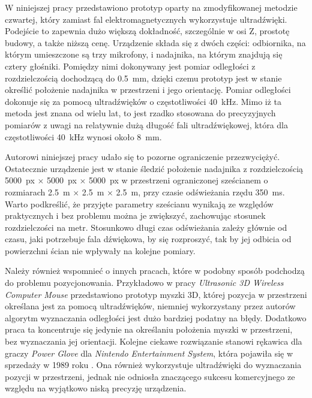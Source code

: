  W niniejszej pracy przedstawiono prototyp oparty na zmodyfikowanej metodzie czwartej, który zamiast 
 fal elektromagnetycznych wykorzystuje ultradźwięki. 
 Podejście to zapewnia dużo większą dokładność, szczególnie w osi Z, prostotę budowy, a także niższą cenę.
 Urządzenie składa się z dwóch części: odbiornika, na którym umieszczone są trzy mikrofony, i nadajnika,
 na którym znajdują się cztery głośniki. Pomiędzy nimi dokonywany jest pomiar odległości z rozdzielczością
 dochodzącą do \SI{0,5}{mm}, dzięki czemu prototyp jest w stanie określić położenie nadajnika
w przestrzeni i jego orientację. 
Pomiar odległości dokonuje się za pomocą ultradźwięków o częstotliwości \SI{40}{kHz}.
Mimo iż ta metoda jest znana od wielu lat, to jest  rzadko stosowana do precyzyjnych pomiarów
z uwagi na relatywnie dużą długość fali ultradźwiękowej,
która dla częstotliwości \SI{40}{kHz} wynosi około \SI{8}{mm}.

Autorowi niniejszej pracy udało się to pozorne ograniczenie przezwyciężyć.
Ostatecznie urządzenie jest w stanie śledzić położenie nadajnika z rozdzielczością 
\SI{5000}{px} $\times$ \SI{5000}{px} $\times$ \SI{5000}{px} w przestrzeni ograniczonej sześcianem o rozmiarach 
\SI{2,5}{m} $\times$ \SI{2,5}{m}  $\times$ \SI{2,5}{m}, przy czasie odświeżania rzędu \SI{350}{ms}.
Warto podkreślić, że przyjęte parametry sześcianu wynikają ze względów praktycznych i bez 
problemu można je zwiększyć, zachowując stosunek rozdzielczości na metr.
Stosunkowo długi czas odświeżania zależy głównie od czasu,  
 jaki potrzebuje fala dźwiękowa, by się rozproszyć,
 tak by jej odbicia od powierzchni ścian nie wpływały na kolejne pomiary.

Należy również wspomnieć o innych pracach, które w podobny sposób podchodzą do problemu pozycjonowania. Przykładowo 
w pracy \textit{Ultrasonic 3D Wireless Computer Mouse} \cite{bib:mouse} przedstawiono prototyp myszki 3D, której
pozycja w przestrzeni określana jest za pomocą ultradźwięków, niemniej wykorzystany przez autorów algorytm wyznaczania 
odległości jest dużo bardziej podatny na błędy. Dodatkowo praca ta koncentruje się jedynie
na określaniu położenia myszki w przestrzeni, bez wyznaczania jej orientacji.
Kolejne ciekawe rozwiązanie stanowi rękawica dla graczy 
\textit{Power Glove} \cite{bib:powerGlove} dla
\textit{Nintendo Entertainment System}, która pojawiła się w sprzedaży w  1989 roku \cite{bib:powerGlove2}. 
Ona również wykorzystuje ultradźwięki do wyznaczania pozycji
w przestrzeni, jednak nie odniosła  znaczącego sukcesu komercyjnego ze względu na wyjątkowo niską precyzję urządzenia.


